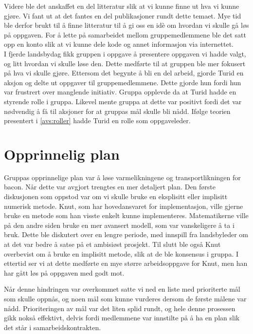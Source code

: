 Videre ble det anskaffet en del litteratur slik at vi kunne finne ut hva vi
kunne gjøre. Vi fant ut at det fantes en del publikasjoner rundt dette temaet.
Mye tid ble derfor brukt til å finne litteratur til å gi oss en idè om hvordan
vi skulle gå løs på oppgaven. For å lette på samarbeidet mellom gruppemedlemmene
ble det satt opp en konto slik at vi kunne dele kode og annet informasjon via
internettet.\\

I fjerde landsbydag fikk gruppen i oppgave å presentere oppgaven vi hadde valgt,
og litt hvordan vi skulle løse den. Dette medførte til at gruppen ble mer
fokusert på hva vi skulle gjøre. Ettersom det begynte å bli en del arbeid,
gjorde Turid en aksjon og delte ut oppgaver til gruppemedlemmene. 
Dette gjorde hun fordi hun var frustrert over manglende initiativ. Gruppa opplevde da
at Turid hadde en styrende rolle i gruppa. Likevel mente gruppa at dette var positivt
fordi det var nødvendig å få til aksjoner for at gruppas mål skulle bli nådd. Ifølge teorien
presentert i \cref{avs:roller} hadde Turid en rolle som oppgaveleder. 

\section{Opprinnelig plan}
Gruppas opprinnelige plan var å løse varmelikningene og transportlikningen for
bacon. Når dette var avgjort trengtes en mer detaljert plan. Den første
diskusjonen som oppstod var om vi skulle bruke en eksplisitt eller implisitt
numerisk metode. Knut, som har hovedansvaret for implementasjon, ville gjerne
bruke en metode som han visste enkelt kunne implementeres. Matematikerne ville
på den andre siden bruke en mer avansert modell, som var vanskeligere å ta i
bruk. Dette ble diskutert over en lengre periode, med innspill fra landsbyleder
om at det var bedre å satse på et ambisiøst prosjekt. Til slutt ble også Knut
overbevist om å bruke en implisitt metode, slik at de ble konsensus i gruppa. I
ettertid ser vi at dette medførte en mye større arbeidsoppgave for Knut, men han
har gått løs på oppgaven med godt mot. 

Når denne hindringen var overkommet satte vi ned en liste med prioriterte mål
som skulle oppnås, og noen mål som kunne vurderes dersom de første målene var
nådd. Prioriteringen av mål var det liten splid rundt, og hele denne prosessen
gikk nokså effektivt, delvis fordi medlemmene var innstilte på å ha en plan slik
det står i samarbeidskontrakten.


